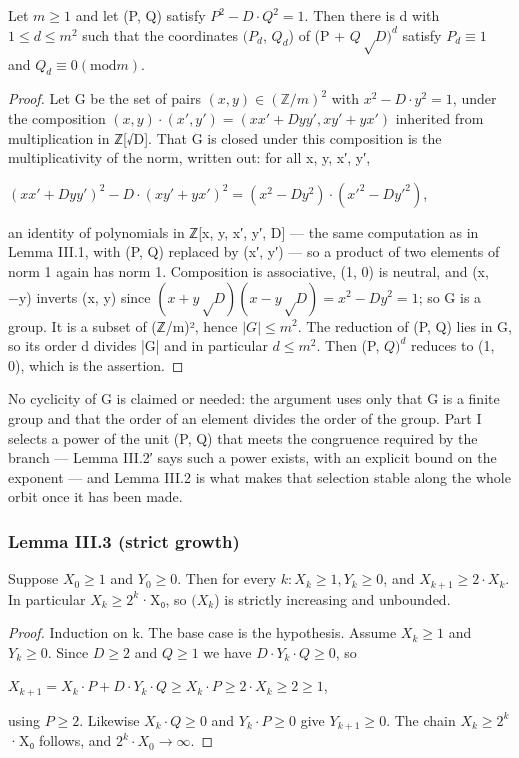 \begin{lemma*}[III.2′.]
Let $m ≥ 1$ and let (P, Q) satisfy $P^{2} − D·Q^{2} = 1$. Then there is d with $1 ≤ d ≤ m^{2}$ such that the coordinates $(P_{d}$, $Q_{d}$) of (P + $Q√D)^{d}$ satisfy $P_{d} ≡ 1$ and $Q_{d} ≡ 0 (\mathrm{mod} m)$.

\end{lemma*}
\begin{proof}
Let G be the set of pairs $(x, y) ∈ (ℤ/m)^{2}$ with $x^{2} − D·y^{2} = 1$, under the composition $(x, y)·(x′, y′) = (x x′ + D y y′, x y′ + y x′)$ inherited from multiplication in ℤ[√D]. That G is closed under this composition is the multiplicativity of the norm, written out: for all x, y, x′, y′,

$(x x′ + D y y′)^{2} − D·(x y′ + y x′)^{2} = (x^{2} − D y^{2})·(x′^{2} − D y′^{2})$,

an identity of polynomials in ℤ[x, y, x′, y′, D] — the same computation as in Lemma III.1, with (P, Q) replaced by (x′, y′) — so a product of two elements of norm 1 again has norm 1. Composition is associative, (1, 0) is neutral, and (x, −y) inverts (x, y) since $(x + y√D)(x − y√D) = x^{2} − D y^{2} = 1$; so G is a group. It is a subset of (ℤ/m)², hence $|G| ≤ m^{2}$. The reduction of (P, Q) lies in G, so its order d divides |G| and in particular $d ≤ m^{2}$. Then (P, $Q)^{d}$ reduces to (1, 0), which is the assertion.

\end{proof}
No cyclicity of G is claimed or needed: the argument uses only that G is a finite group and that the order of an element divides the order of the group. Part I selects a power of the unit (P, Q) that meets the congruence required by the branch — Lemma III.2′ says such a power exists, with an explicit bound on the exponent — and Lemma III.2 is what makes that selection stable along the whole orbit once it has been made.

\subsubsection*{Lemma III.3 (strict growth)}
Suppose $X_{0} ≥ 1$ and $Y_{0} ≥ 0$. Then for every $k: X_{k} ≥ 1, Y_{k} ≥ 0$, and $X_{k+1} ≥ 2·X_{k}$. In particular $X_{k} ≥ 2^{k}$·X₀, so $(X_{k}$) is strictly increasing and unbounded.

\begin{proof}
Induction on k. The base case is the hypothesis. Assume $X_{k} ≥ 1$ and $Y_{k} ≥ 0$. Since $D ≥ 2$ and $Q ≥ 1$ we have $D·Y_{k}·Q ≥ 0$, so

$X_{k+1} = X_{k}·P + D·Y_{k}·Q ≥ X_{k}·P ≥ 2·X_{k} ≥ 2 ≥ 1$,

using $P ≥ 2$. Likewise $X_{k}·Q ≥ 0$ and $Y_{k}·P ≥ 0$ give $Y_{k+1} ≥ 0$. The chain $X_{k} ≥ 2^{k}$·X₀ follows, and $2^{k}·X_{0} → ∞$.

\end{proof}
